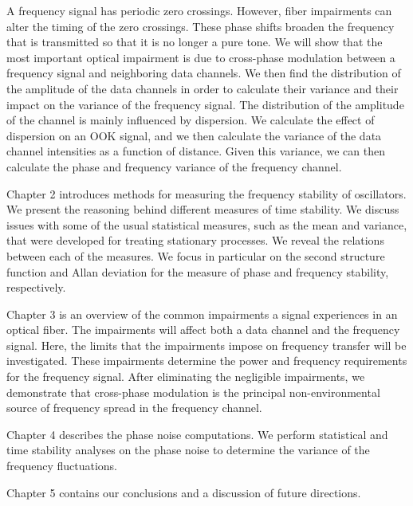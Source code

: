 A frequency signal has periodic zero crossings.  However, fiber impairments can alter the timing of the zero crossings.  These phase shifts broaden the frequency that is transmitted so that it is no longer a pure tone. We will show that the most important optical impairment is due to cross-phase modulation between a frequency signal and neighboring data channels. We then find the distribution of the amplitude of the data channels in order to calculate their variance and their impact on the variance of the frequency signal.  The distribution of the amplitude of the channel is mainly influenced by dispersion.  We calculate the effect of dispersion on an OOK signal, and we then calculate the variance of the data channel intensities as a function of distance. Given this variance, we can then calculate the phase and frequency variance of the frequency channel.


Chapter 2 introduces methods for measuring the frequency stability of oscillators. We present the reasoning behind different measures of time stability. We discuss issues with some of the usual statistical measures, such as the mean and  variance, that were developed for treating stationary processes. We reveal the relations between each of the measures. We focus in particular on the second structure function and Allan deviation for the measure of phase and frequency stability, respectively.

Chapter 3 is an overview of the common impairments a signal experiences in an optical fiber.  The impairments will affect both a data channel and the frequency signal. Here, the limits that the impairments impose on frequency transfer will be investigated. These impairments determine the power and frequency requirements for the frequency signal. After eliminating the negligible impairments, we demonstrate that cross-phase modulation is the principal non-environmental source of frequency spread in the frequency channel.

Chapter 4 describes the phase noise computations.  We perform statistical and time stability analyses on the phase noise to determine the variance of the frequency fluctuations.

Chapter 5 contains our conclusions and a discussion of future directions.


